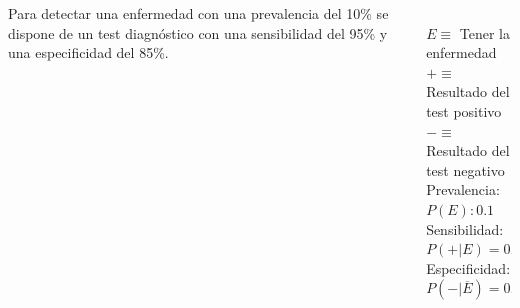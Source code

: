 \documentclass[aspectratio=149,10pt,t]{beamer}
\begin{document}
\begin{frame}
	\begin{columns}
		\begin{column}[T]{0.6\textwidth}
			Para detectar una enfermedad con una prevalencia del 10\% se dispone de un test diagnóstico con una sensibilidad del 95\% y una especificidad del 85\%.
		\end{column}
		\begin{column}[T]{0.4\textwidth}
			\\
			$E \equiv$ Tener la enfermedad\\
			$+ \equiv$ Resultado del test positivo\\
			$- \equiv$ Resultado del test negativo\\
			Prevalencia: $P(E):0.1$\\
			Sensibilidad: $P(+|E)=0.95$\\
			Especificidad: $P(-|\overline E)=0.85$
		\end{column}
	\end{columns}
\end{frame}
\end{document}
